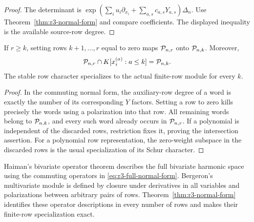 \begin{proof}
The determinant is
$\exp(\sum_i u_i\partial_{x_i}+\sum_{a,s}c_{a,s}Y_{a,s})\Delta_n$.
Use Theorem~\ref{thm:r3-normal-form} and compare coefficients.
The displayed inequality is the available source-row degree.
\end{proof}

\begin{corollary}
\label{cor:r3-exact-specialization}
If $r\geq k$, setting rows $k+1,\ldots,r$ equal to zero maps
$\mathcal P_{n,r}$ onto $\mathcal P_{n,k}$.  Moreover,
\[
 \mathcal P_{n,r}\cap K[x_i^{(a)}:a\leq k]=\mathcal P_{n,k}.
\]
The stable row character specializes to the actual finite-row module
for every $k$.
\end{corollary}

\begin{proof}
In the commuting normal form, the auxiliary-row degree of a word is
exactly the number of its corresponding $Y$ factors.  Setting a row
to zero kills precisely the words using a polarization into that row.
All remaining words belong to $\mathcal P_{n,k}$, and every such word
already occurs in $\mathcal P_{n,r}$.
If a polynomial is independent of the discarded rows, restriction
fixes it, proving the intersection assertion.
For a polynomial row representation, the zero-weight subspace in
the discarded rows is the usual specialization of its Schur character.
\end{proof}

Haiman's bivariate operator theorem
\cite[Theorem~4.2]{Haiman} describes the full bivariate harmonic
space using the commuting operators in
\eqref{eq:r3-full-normal-form}.  Bergeron's multivariate module
\cite[Section~2.1]{Bergeron} is defined by closure under derivatives
in all variables and polarizations between arbitrary pairs of rows.
Theorem~\ref{thm:r3-normal-form} identifies these operator
descriptions in every number of rows and makes their finite-row
specialization exact.

